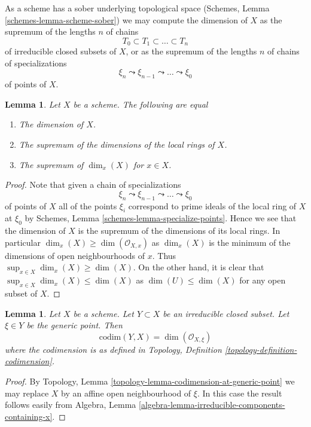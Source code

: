\documentclass{stacks-project}
\theoremstyle{plain}
\newtheorem{lemma}[subsection]{Lemma}
\theoremstyle{definition}
\theoremstyle{remark}
\numberwithin{equation}{subsection}
\begin{document}
\noindent
As a scheme has a sober underlying topological space
(Schemes, Lemma \ref{schemes-lemma-scheme-sober})
we may compute the dimension of $X$ as the supremum of the lengths $n$
of chains
$$
T_0 \subset T_1 \subset \ldots \subset T_n
$$
of irreducible closed subsets of $X$, or as the supremum of the lengths $n$
of chains of specializations
$$
\xi_n \leadsto \xi_{n - 1} \leadsto \ldots \leadsto \xi_0
$$
of points of $X$.

\begin{lemma}
\label{lemma-dimension}
Let $X$ be a scheme. The following are equal
\begin{enumerate}
\item The dimension of $X$.
\item The supremum of the dimensions of the local rings of $X$.
\item The supremum of $\dim_x(X)$ for $x \in X$.
\end{enumerate}
\end{lemma}

\begin{proof}
Note that given a chain of specializations
$$
\xi_n \leadsto \xi_{n - 1} \leadsto \ldots \leadsto \xi_0
$$
of points of $X$ all of the points $\xi_i$ correspond to prime ideals
of the local ring of $X$ at $\xi_0$ by
Schemes, Lemma \ref{schemes-lemma-specialize-points}.
Hence we see that the dimension of $X$ is the supremum of the dimensions
of its local rings. In particular $\dim_x(X) \geq \dim(\mathcal{O}_{X, x})$
as $\dim_x(X)$ is the minimum of the dimensions of open neighbourhoods of
$x$. Thus $\sup_{x \in X} \dim_x(X) \geq \dim(X)$. On the other hand,
it is clear that $\sup_{x \in X} \dim_x(X) \leq \dim(X)$
as $\dim(U) \leq \dim(X)$ for any open subset of $X$.
\end{proof}

\begin{lemma}
\label{lemma-codimension-local-ring}
Let $X$ be a scheme. Let $Y \subset X$ be an irreducible closed
subset. Let $\xi \in Y$ be the generic point. Then
$$
\text{codim}(Y, X) = \dim(\mathcal{O}_{X, \xi})
$$
where the codimension is as defined in
Topology, Definition \ref{topology-definition-codimension}.
\end{lemma}

\begin{proof}
By Topology, Lemma \ref{topology-lemma-codimension-at-generic-point}
we may replace $X$ by an affine open neighbourhood of $\xi$. In this
case the result follows easily from
Algebra, Lemma \ref{algebra-lemma-irreducible-components-containing-x}.
\end{proof}
\end{document}
